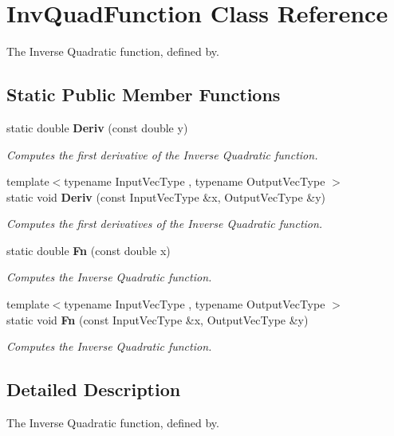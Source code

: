 \section{Inv\+Quad\+Function Class Reference}
\label{classmlpack_1_1ann_1_1InvQuadFunction}


The Inverse Quadratic function, defined by.  


\subsection*{Static Public Member Functions}
\begin{DoxyCompactItemize}
\item 
static double \textbf{ Deriv} (const double y)
\begin{DoxyCompactList}\small\item\em Computes the first derivative of the Inverse Quadratic function. \end{DoxyCompactList}\item 
{\footnotesize template$<$typename Input\+Vec\+Type , typename Output\+Vec\+Type $>$ }\\static void \textbf{ Deriv} (const Input\+Vec\+Type \&x, Output\+Vec\+Type \&y)
\begin{DoxyCompactList}\small\item\em Computes the first derivatives of the Inverse Quadratic function. \end{DoxyCompactList}\item 
static double \textbf{ Fn} (const double x)
\begin{DoxyCompactList}\small\item\em Computes the Inverse Quadratic function. \end{DoxyCompactList}\item 
{\footnotesize template$<$typename Input\+Vec\+Type , typename Output\+Vec\+Type $>$ }\\static void \textbf{ Fn} (const Input\+Vec\+Type \&x, Output\+Vec\+Type \&y)
\begin{DoxyCompactList}\small\item\em Computes the Inverse Quadratic function. \end{DoxyCompactList}\end{DoxyCompactItemize}


\subsection{Detailed Description}
The Inverse Quadratic function, defined by. 

